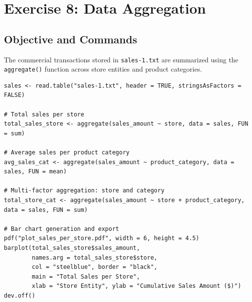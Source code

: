 \documentclass[11pt,a4paper]{article}
\begin{document}
\section{Exercise 8: Data Aggregation}

\subsection{Objective and Commands}
The commercial transactions stored in \texttt{sales-1.txt} are summarized using the \texttt{aggregate()} function across store entities and product categories.

\begin{lstlisting}
sales <- read.table("sales-1.txt", header = TRUE, stringsAsFactors = FALSE)

# Total sales per store
total_sales_store <- aggregate(sales_amount ~ store, data = sales, FUN = sum)

# Average sales per product category
avg_sales_cat <- aggregate(sales_amount ~ product_category, data = sales, FUN = mean)

# Multi-factor aggregation: store and category
total_store_cat <- aggregate(sales_amount ~ store + product_category, data = sales, FUN = sum)

# Bar chart generation and export
pdf("plot_sales_per_store.pdf", width = 6, height = 4.5)
barplot(total_sales_store$sales_amount,
        names.arg = total_sales_store$store,
        col = "steelblue", border = "black",
        main = "Total Sales per Store",
        xlab = "Store Entity", ylab = "Cumulative Sales Amount ($)")
dev.off()
\end{lstlisting}
\end{document}
